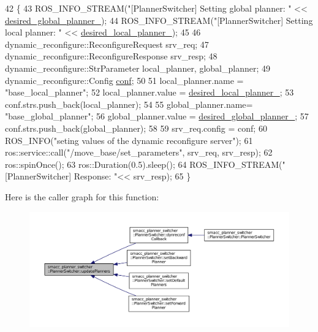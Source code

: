 \begin{DoxyCode}
42 \{
43   ROS\_INFO\_STREAM(\textcolor{stringliteral}{"[PlannerSwitcher] Setting global planner: "} << 
      \hyperlink{classsmacc__planner__switcher_1_1PlannerSwitcher_aed229df648a0903e3cdf77682220efb5}{desired\_global\_planner\_});
44   ROS\_INFO\_STREAM(\textcolor{stringliteral}{"[PlannerSwitcher] Setting local planner: "} << 
      \hyperlink{classsmacc__planner__switcher_1_1PlannerSwitcher_aecc5958653ed39dd7611783043d23345}{desired\_local\_planner\_});
45 
46   dynamic\_reconfigure::ReconfigureRequest srv\_req;
47   dynamic\_reconfigure::ReconfigureResponse srv\_resp;
48   dynamic\_reconfigure::StrParameter local\_planner, global\_planner;
49   dynamic\_reconfigure::Config \hyperlink{namespaceconf}{conf};
50 
51   local\_planner.name = \textcolor{stringliteral}{"base\_local\_planner"};
52   local\_planner.value =  \hyperlink{classsmacc__planner__switcher_1_1PlannerSwitcher_aecc5958653ed39dd7611783043d23345}{desired\_local\_planner\_};
53   conf.strs.push\_back(local\_planner);
54 
55   global\_planner.name= \textcolor{stringliteral}{"base\_global\_planner"};
56   global\_planner.value = \hyperlink{classsmacc__planner__switcher_1_1PlannerSwitcher_aed229df648a0903e3cdf77682220efb5}{desired\_global\_planner\_};
57   conf.strs.push\_back(global\_planner);
58   
59   srv\_req.config = conf;
60   ROS\_INFO(\textcolor{stringliteral}{"seting values of the dynamic reconfigure server"});
61   ros::service::call(\textcolor{stringliteral}{"/move\_base/set\_parameters"}, srv\_req, srv\_resp);
62   ros::spinOnce();
63   ros::Duration(0.5).sleep();
64   ROS\_INFO\_STREAM(\textcolor{stringliteral}{"[PlannerSwitcher] Response: "}<< srv\_resp);
65 \}
\end{DoxyCode}


Here is the caller graph for this function\+:
\nopagebreak
\begin{figure}[H]
\begin{center}
\leavevmode
\includegraphics[width=350pt]{classsmacc__planner__switcher_1_1PlannerSwitcher_ae45c57b459f1eb9ee4cc3c6dc6dc0995_icgraph}
\end{center}
\end{figure}




